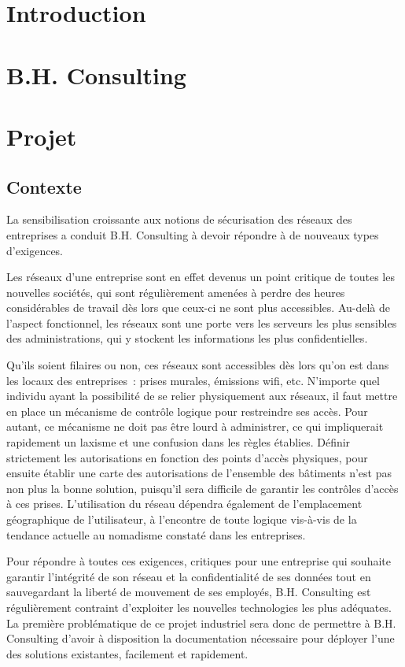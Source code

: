 \newcommand{\titreA}{Rapport intermédiaire}
\newcommand{\titreB}{Projet industriel}


\section{Introduction}
\section{B.H. Consulting}
\section{Projet}
\subsection{Contexte}

La sensibilisation croissante aux notions de sécurisation des réseaux des entreprises a conduit B.H. Consulting à devoir répondre à de nouveaux types d'exigences.

Les réseaux d'une entreprise sont en effet devenus un point critique de toutes les nouvelles sociétés, qui sont régulièrement amenées à perdre des heures considérables de travail dès lors que ceux-ci ne sont plus accessibles. Au-delà de l'aspect fonctionnel, les réseaux sont une porte vers les serveurs les plus sensibles des administrations, qui y stockent les informations les plus confidentielles.

Qu'ils soient filaires ou non, ces réseaux sont accessibles dès lors qu'on est dans les locaux des entreprises~: prises murales, émissions wifi, etc. N'importe quel individu ayant la possibilité de se relier physiquement aux réseaux, il faut mettre en place un mécanisme de contrôle logique pour restreindre ses accès. Pour autant, ce mécanisme ne doit pas être lourd à administrer, ce qui impliquerait rapidement un laxisme et une confusion dans les règles établies. Définir strictement les autorisations en fonction des points d'accès physiques, pour ensuite établir une carte des autorisations de l'ensemble des bâtiments n'est pas non plus la bonne solution, puisqu'il sera difficile de garantir les contrôles d'accès à ces prises. L'utilisation du réseau dépendra également de  l'emplacement géographique de l'utilisateur, à l'encontre de toute logique vis-à-vis de la tendance actuelle au nomadisme constaté dans les entreprises.

Pour répondre à toutes ces exigences, critiques pour une entreprise qui souhaite garantir l'intégrité de son réseau et la confidentialité de ses données tout en sauvegardant la liberté de mouvement de ses employés, B.H. Consulting est régulièrement contraint d'exploiter les nouvelles technologies les plus adéquates. La première problématique de ce projet industriel sera donc de permettre à B.H. Consulting d'avoir à disposition la documentation nécessaire pour déployer l'une des solutions existantes, facilement et rapidement.

